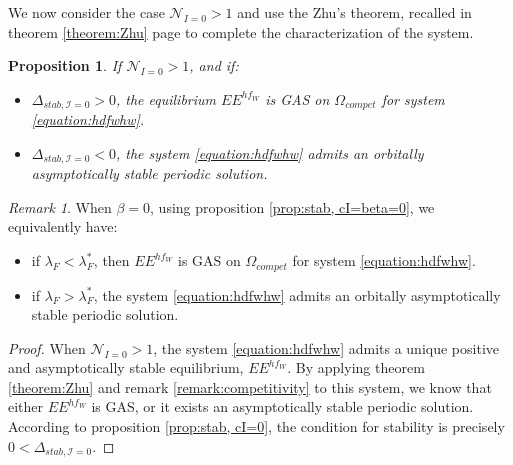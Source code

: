 \documentclass{article}
\newcommand{\lfw}{\lambda_{F}}
\newcommand{\lfw}{\lambda_{F}}
\newcommand{\cI}{\mathcal{I}}
\newtheorem{prop}[theorem]{Proposition}
\theoremstyle{definition}
\theoremstyle{remark}
\newtheorem{remark}[theorem]{Remark}
\begin{document}
%
%

We now consider the case $\mathcal{N}_{I = 0} > 1$ and use the Zhu's  theorem, recalled in theorem \ref{theorem:Zhu} page \pageref{theorem:Zhu} to complete the characterization of the system.

\begin{prop}
\label{prop:limitCycle, cI=0}
If $\mathcal{N}_{I =0} > 1$, and if:
\begin{itemize}
\item $\Delta_{stab, \cI =0} > 0$, the equilibrium $EE^{hf_W}$ is GAS on $\Omega_{compet}$ for system \eqref{equation:hdfwhw}.
\item $\Delta_{stab, \cI =0} < 0$, the system \eqref{equation:hdfwhw} admits an orbitally asymptotically stable periodic solution.
\end{itemize}
\end{prop}

\begin{remark}
When $\beta = 0$, using proposition \ref{prop:stab, cI=beta=0}, we equivalently have:
\begin{itemize}
\item if $\lfw <  \lfw^*$, then $EE^{hf_W}$ is GAS on $\Omega_{compet}$ for system \eqref{equation:hdfwhw}.
\item if $\lfw  > \lfw^*$, the system \eqref{equation:hdfwhw} admits an orbitally asymptotically stable periodic solution.
\end{itemize}
\end{remark}

\begin{proof}
When $\mathcal{N}_{I =0} > 1$, the system \eqref{equation:hdfwhw} admits a unique positive and asymptotically stable equilibrium, $EE^{hf_W}$. By applying theorem \ref{theorem:Zhu} and remark \ref{remark:competitivity} to this system, we know that either $EE^{hf_W}$ is GAS, or it exists an asymptotically stable periodic solution. According to proposition \ref{prop:stab, cI=0}, the condition for stability is precisely $0 < \Delta_{stab, \cI =0}$. 
\end{proof}
\end{document}
